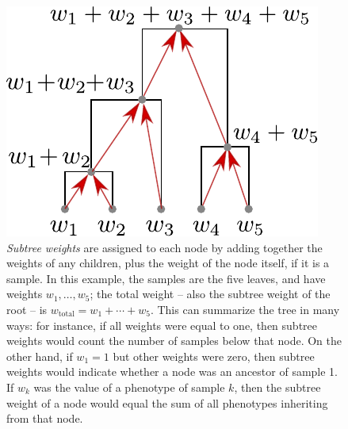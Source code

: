 \documentclass[9pt,twoside,lineno]{gsajnl}
\newcommand{\iw}{w} %
\newcommand{\tiw}{w_\text{total}} %
\begin{document}
\begin{figure}
    \begin{center}
        \includegraphics{figures/adding_weights}
    \end{center}
    \caption{
        \emph{Subtree weights} are assigned to each node by adding together the weights of any children,
        plus the weight of the node itself, if it is a sample.
        In this example, the samples are the five leaves, and have weights
        $\iw_1, \ldots, \iw_5$; the total weight -- also the subtree weight of the root --
        is $\tiw = \iw_1 + \cdots + \iw_5$.
        This can summarize the tree in many ways:
        for instance, if all weights were equal to one, then subtree weights would count the number of
        samples below that node.
        On the other hand, if $\iw_1 = 1$ but other weights were zero,
        then subtree weights would indicate whether a node was an ancestor of sample 1.
        If $\iw_k$ was the value of a phenotype of sample $k$,
        then the subtree weight of a node
        would equal the sum of all phenotypes inheriting from that node.
        \label{fig:adding_weights}
    }
\end{figure}
\end{document}
